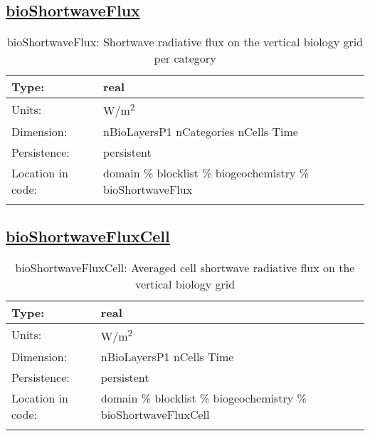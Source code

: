 \subsection[bioShortwaveFlux]{\hyperref[sec:var_tab_biogeochemistry]{bioShortwaveFlux}}
\label{subsec:var_sec_biogeochemistry_bioShortwaveFlux}
\begin{center}
\begin{longtable}{| p{2.0in} | p{4.0in} |}
        \hline 
        Type: & real \\
        \hline 
        Units: & \si{W/m^2} \\
        \hline 
        Dimension: & nBioLayersP1 nCategories nCells Time \\
        \hline 
        Persistence: & persistent \\
        \hline 
         Location in code: & domain \% blocklist \% biogeochemistry \% bioShortwaveFlux \\
         \hline 
    \caption{bioShortwaveFlux: Shortwave radiative flux on the vertical biology grid per category}
\end{longtable}
\end{center}
\subsection[bioShortwaveFluxCell]{\hyperref[sec:var_tab_biogeochemistry]{bioShortwaveFluxCell}}
\label{subsec:var_sec_biogeochemistry_bioShortwaveFluxCell}
\begin{center}
\begin{longtable}{| p{2.0in} | p{4.0in} |}
        \hline 
        Type: & real \\
        \hline 
        Units: & \si{W/m^2} \\
        \hline 
        Dimension: & nBioLayersP1 nCells Time \\
        \hline 
        Persistence: & persistent \\
        \hline 
         Location in code: & domain \% blocklist \% biogeochemistry \% bioShortwaveFluxCell \\
         \hline 
    \caption{bioShortwaveFluxCell: Averaged cell shortwave radiative flux on the vertical biology grid}
\end{longtable}
\end{center}
